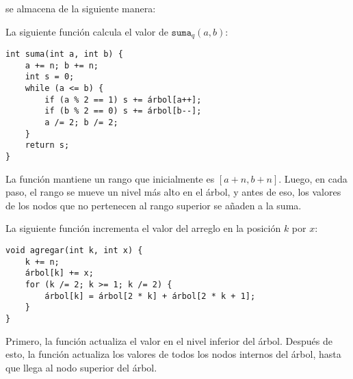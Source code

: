 se almacena de la siguiente manera:
\begin{center}
\end{center}

\newpage
La siguiente función
calcula el valor de $\texttt{suma}_q(a,b)$:
\begin{lstlisting}
int suma(int a, int b) {
    a += n; b += n;
    int s = 0;
    while (a <= b) {
        if (a % 2 == 1) s += árbol[a++];
        if (b % 2 == 0) s += árbol[b--];
        a /= 2; b /= 2;
    }
    return s;
}
\end{lstlisting}
La función mantiene un rango
que inicialmente es $[a+n,b+n]$.
Luego, en cada paso, el rango se mueve
un nivel más alto en el árbol,
y antes de eso, los valores de los nodos que no
pertenecen al rango superior se añaden a la suma.

La siguiente función incrementa el valor del arreglo
en la posición $k$ por $x$:
\begin{lstlisting}
void agregar(int k, int x) {
    k += n;
    árbol[k] += x;
    for (k /= 2; k >= 1; k /= 2) {
        árbol[k] = árbol[2 * k] + árbol[2 * k + 1];
    }
}
\end{lstlisting}
Primero, la función actualiza el valor
en el nivel inferior del árbol.
Después de esto, la función actualiza los valores de todos
los nodos internos del árbol, hasta que llega
al nodo superior del árbol.

